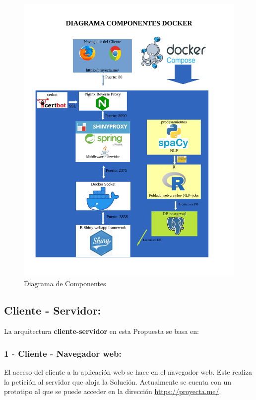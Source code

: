 \documentclass[
  10,
  openany]{book}
\begin{document}
\begin{figure}
\includegraphics[width=0.9\linewidth]{formas/diagrama_docker1} \caption{Diagrama de Componentes}\label{fig:esquemadocker}
\end{figure}

\hypertarget{cliente---servidor}{%
\subsection{Cliente - Servidor:}\label{cliente---servidor}}

La arquitectura \textbf{cliente-servidor} en esta Propuesta se basa en:

\hypertarget{cliente---navegador-web}{%
\subsubsection{1 - Cliente - Navegador web:}\label{cliente---navegador-web}}

El acceso del cliente a la aplicación web se hace en el navegador web. Este realiza la petición al servidor que aloja la Solución. Actualmente se cuenta con un prototipo al que se puede acceder en la dirección \url{https://proyecta.me/}.
\end{document}
